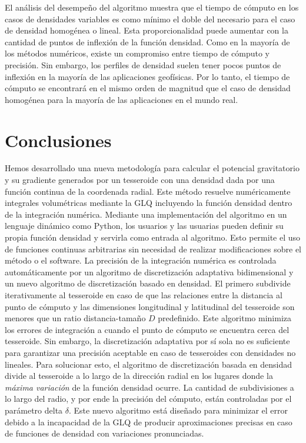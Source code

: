 El análisis del desempeño del algoritmo muestra que el tiempo de cómputo
en los casos de densidades variables es como mínimo el doble del
necesario para el caso de densidad homogénea o lineal.
Esta proporcionalidad puede aumentar con la cantidad de puntos de inflexión de
la función densidad.
Como en la mayoría de los métodos numéricos, existe un compromiso entre tiempo
de cómputo y precisión.
Sin embargo, los perfiles de densidad suelen tener pocos puntos de inflexión en
la mayoría de las aplicaciones geofísicas.
Por lo tanto, el tiempo de cómputo se encontrará en el mismo orden de magnitud
que el caso de densidad homogénea para la mayoría de las aplicaciones en el
mundo real.


\section{Conclusiones}

Hemos desarrollado una nueva metodología para calcular el potencial
gravitatorio y su gradiente generados por un tesseroide con una densidad dada
por una función continua de la coordenada radial.
Este método resuelve numéricamente integrales volumétricas mediante la \ac{GLQ}
incluyendo la función densidad dentro de la integración numérica.
Mediante una implementación del algoritmo en un lenguaje dinámico como Python,
los usuarios y las usuarias pueden definir su propia función densidad
y servirla como entrada al algoritmo.
Esto permite el uso de funciones continuas arbitrarias sin necesidad de
realizar modificaciones sobre el método o el software.
La precisión de la integración numérica es controlada automáticamente por un
algoritmo de discretización adaptativa bidimensional y un nuevo algoritmo de
discretización basado en densidad.
El primero subdivide iterativamente al tesseroide en caso de que las relaciones
entre la distancia al punto de cómputo y las dimensiones longitudinal
y latitudinal del tesseroide son menores que un ratio distancia-tamaño $D$
predefinido.
Este algoritmo minimiza los errores de integración a cuando el punto de
cómputo se encuentra cerca del tesseroide.
Sin embargo, la discretización adaptativa por sí sola no es suficiente para
garantizar una precisión aceptable en caso de tesseroides con densidades no
lineales.
Para solucionar esto, el algoritmo de discretización basada en densidad divide
al tesseroide a lo largo de la dirección radial en los lugares donde la
\emph{máxima variación} de la función densidad ocurre.
La cantidad de subdivisiones a lo largo del radio, y por ende la precisión del
cómputo, están controladas por el parámetro delta $\delta$.
Este nuevo algoritmo está diseñado para minimizar el error debido a la
incapacidad de la \ac{GLQ} de producir aproximaciones precisas en caso de
funciones de densidad con variaciones pronunciadas.

